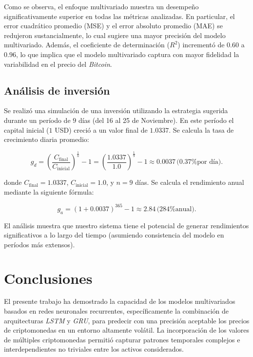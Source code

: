\documentclass[]{article}
\begin{document}
Como se observa, el enfoque multivariado muestra un desempeño significativamente superior en todas las métricas analizadas. En particular, el error cuadrático promedio (MSE) y el error absoluto promedio (MAE) se redujeron sustancialmente, lo cual sugiere una mayor precisión del modelo multivariado. Además, el coeficiente de determinación ($R^2$) incrementó de $0.60$ a $0.96$, lo que implica que el modelo multivariado captura con mayor fidelidad la variabilidad en el precio del \textit{Bitcoin}.

\subsection{Análisis de inversión}

Se realizó una simulación de una inversión utilizando la estrategia sugerida durante un período de $9$ días (del 16 al 25 de Noviembre). En este período el capital inicial ($1$ USD) creció a un valor final de $1.0337$. Se calcula la tasa de crecimiento diaria promedio:

\begin{equation}
	g_d = \left( \frac{C_{\text{final}}}{C_{\text{inicial}}} \right)^{\frac{1}{n}} - 1 = \left( \frac{1.0337}{1.0} \right)^{\frac{1}{9}} - 1 \approx 0.0037 \, \text{(0.37\% por día)}.
\end{equation}

donde $C_{\text{final}} = 1.0337$, $C_{\text{inicial}} = 1.0$, y $n = 9$ días. Se calcula el rendimiento anual mediante la siguiente fórmula:

\begin{equation}
	g_a = (1 + 0.0037)^{365} - 1 \approx 2.84 \, \text{(284\% anual)}.
\end{equation}

El análisis muestra que nuestro sistema tiene el potencial de generar rendimientos significativos a lo largo del tiempo (asumiendo consistencia del modelo en períodos más extensos).

\section{Conclusiones}

El presente trabajo ha demostrado la capacidad de los modelos multivariados basados en redes neuronales recurrentes, específicamente la combinación de arquitecturas \textit{LSTM}  y \textit{GRU}, para predecir con una precisión aceptable los precios de criptomonedas en un entorno altamente volátil. La incorporación de los valores de múltiples criptomonedas permitió capturar patrones temporales complejos e interdependientes no triviales entre los activos considerados.
\end{document}
